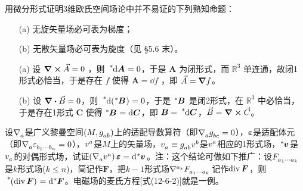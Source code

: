 \begin{xiti}
	\item 用微分形式证明3维欧氏空间场论中并不易证的下列熟知命题：
	\begin{enumerate}
		\item[(a)] 无旋矢量场必可表为梯度；
		\item[(b)] 无散矢量场必可表为旋度（见 \S 5.6 末）。
	\end{enumerate}

    \begin{zm}
    	\begin{enumerate}
    		\item[(a)] 设 $\curl{\vec{A}}=0$ ，则 $\tensor[^*]{\dd{\bm{A}}}{}=0 $，于是 $\bm{A}$ 为闭形式，而 $\mathbb{R}^3$ 单连通，故闭1形式必恰当，于是存在 $f$ 使得 $\bm{A} = \dd{f}$ ，即 $\vec{A}= \grad{f}$。
    		\item[(b)] 设 $\div{\vec{B}}=0$，则 $\tensor[^*]{\dd(\tensor[^*]{\bm{B}}{})}{}=0$，于是 $\tensor[^*]{\bm{B}}{}$ 是闭2形式，在 $\mathbb{R}^3$ 中必恰当，于是存在1形式 $\bm{C}$ 使得 $\tensor[^*]{\bm{B}}{} = \dd{\bm{C}}$，即 $\bm{B} = \tensor[^*]{\dd{\bm{C}}}{}$，$\vec{B}=\curl{\vec{C}}$。
    	\end{enumerate}
    \end{zm}

    \item 设$\Nabla{a} $是广义黎曼空间$\left(M,\tensor{g}{_a_b} \right) $上的适配导数算符（即$\Nabla{a} \tensor{g}{_b_c}=0 $），$\bm{\varepsilon} $是适配体元（即$\Nabla{a} \tensor{\varepsilon}{_{b_1 \cdots b_n}}=0 $），$\tensor{v}{^a} $是$M$上的矢量场，$\tensor{v}{_a} \equiv \tensor{g}{_a_b} \tensor{v}{^b} $是$\tensor{v}{^a} $相应的1形式场，$\tensor[^*]{\bm{v}}{} $是$\tensor{v}{_a} $的对偶形式场，试证$\left( \Nabla{a} \tensor{v}{^a} \right) \bm{\varepsilon} = \dd{\tensor[^*]{\bm{v}}{}} $。注：这个结论可做如下推广：设$\tensor{F}{_{a_1 \cdots a_k}} $是$k$形式场($k\leqslant n $)，简记作$\bm{F} $，把$k-1$形式场$\tensor{\nabla}{^{a_k}} \tensor{F}{_{a_1 \cdots a_k}} $记作$\operatorname{div} \bm{F} $，则$\tensor[^*]{\left(\ddiv\bm{F} \right)}{} = \dd{\tensor[^*]{\bm{F}}{}} $。电磁场的麦氏方程[式(12-6-2)]就是一例。


\end{xiti}
